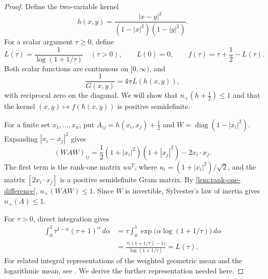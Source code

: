 \begin{proof}
Define the two-variable kernel
\[
 h(x,y)=\frac{|x-y|^2}{(1-|x|^2)(1-|y|^2)}.
\]
For a scalar argument $\tau\ge0$, define
\[
 L(\tau)=\frac1{\log(1+1/\tau)}\quad(\tau>0),\qquad L(0)=0,
 \qquad f(\tau)=\tau+\frac12-L(\tau).
\]
Both scalar functions are continuous on $[0,\infty)$, and
\[
 \frac1{G(x,y)}=4\pi L(h(x,y)),
\]
with reciprocal zero on the diagonal.
We will show that $n_+(h+\tfrac12)\le1$ and that the kernel
$(x,y)\mapsto f(h(x,y))$ is positive semidefinite.

For a finite set $x_1,\ldots,x_n$, put
$A_{ij}=h(x_i,x_j)+\tfrac12$ and
$W=\operatorname{diag}(1-|x_i|^2)$. Expanding $|x_i-x_j|^2$ gives
\begin{equation}\label{eq:regularization-rank-one}
 (WAW)_{ij}
 =\frac12(1+|x_i|^2)(1+|x_j|^2)-2x_i\cdot x_j.
\end{equation}
The first term is the rank-one matrix $uu^T$, where
$u_i=(1+|x_i|^2)/\sqrt2$, and the matrix $[2x_i\cdot x_j]$
is a positive semidefinite Gram matrix. By
\cref{lem:rank-one-difference}, $n_+(WAW)\le1$.
Since $W$ is invertible, Sylvester's law of inertia gives $n_+(A)\le1$.

For $\tau>0$, direct integration gives
\begin{equation}\label{eq:logarithmic-mean-integral}
 \begin{aligned}
 \int_0^1\tau^{1-\alpha}(\tau+1)^\alpha\,d\alpha
 &=\tau\int_0^1
        \exp\bigl(\alpha\log(1+1/\tau)\bigr)\,d\alpha\\
 &=\frac{\tau\bigl((1+1/\tau)-1\bigr)}{\log(1+1/\tau)}
 =L(\tau).
 \end{aligned}
\end{equation}
For related integral representations of the weighted geometric mean
and the logarithmic mean, see \cite{QiZhangLi}. We derive the further
representation needed here.


\end{proof}

